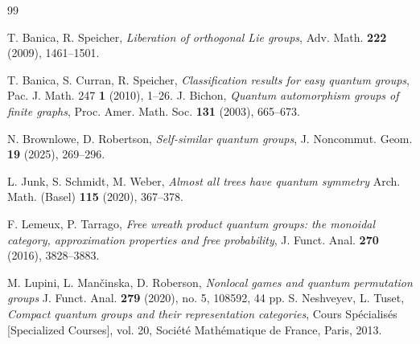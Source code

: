 \documentclass[12pt, a4paper]{amsart}
\theoremstyle{definition}
\theoremstyle{remark}
\numberwithin{equation}{section}
\begin{document}


\begin{thebibliography}{99}
	

 T. Banica, R. Speicher, \emph{Liberation of orthogonal Lie groups}, Adv. Math. {\bf 222} (2009), 1461--1501.

 T. Banica, S. Curran, R. Speicher, \emph{Classification results for easy quantum groups}, Pac. J. Math. 247 {\bf 1} (2010), 1--26.
%	
 J. Bichon, \emph{Quantum automorphism groups of finite graphs}, Proc. Amer. Math. Soc. {\bf 131} (2003), 665--673.
%	
%	

 N. Brownlowe, D. Robertson, \emph{Self-similar quantum groups}, J. Noncommut. Geom. {\bf 19} (2025), 269--296.
%	
%	

 L. Junk, S. Schmidt, M. Weber, \emph{Almost all trees have quantum symmetry} Arch. Math. (Basel) {\bf 115} (2020), 367--378.

 F. Lemeux, P. Tarrago, \emph{Free wreath product quantum groups: the monoidal category, approximation properties and free probability}, J. Funct. Anal. {\bf 270} (2016), 3828--3883.

 M. Lupini, L. Man\v{c}inska, D. Roberson, \emph{Nonlocal games and quantum permutation groups} J. Funct. Anal. {\bf 279} (2020), no. 5, 108592, 44 pp.
%	
 S. Neshveyev, L. Tuset, \emph{Compact quantum groups and their representation categories}, Cours Sp\'{e}cialis\'{e}s [Specialized Courses], vol. 20, Soci\'{e}t\'{e} Math\'{e}matique de France, Paris, 2013.


\end{thebibliography}
\end{document}
